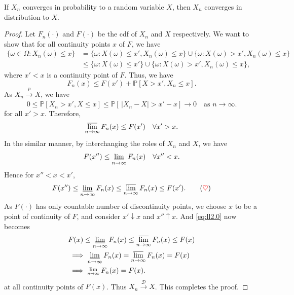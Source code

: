\begin{theorem}
    If $X_n$ converges in probability to a random variable $X$, then $X_n$ converges in distribution to $X$.
\end{theorem}
\begin{proof}
    Let $F_n(\cdot)$ and $F(\cdot)$ be the cdf of $X_n$ and $X$ respectively. We want to show that for all continuity points $x$ of $F$, we have
    \begin{align*}
        \{ \omega \in \Omega : X_n(\omega) \leq x \} &= 
        \{ \omega : X(\omega) \leq x', X_n(\omega) \leq x \} \cup 
        \{ \omega : X(\omega) > x', X_n(\omega) \leq x \}\\
        &\leq \{ \omega : X(\omega) \leq x' \} \cup \{ \omega : X(\omega) > x', X_n(\omega) \leq x\},
    \end{align*}
    where $x' < x$ is a continuity point of $F$. Thus, we have
    \begin{equation}
        F_n(x) \leq F(x') + \mathbb{P}[X > x', X_n \leq x].
    \end{equation}
    As $X_n \xrightarrow[]{p} X$, we have 
    \begin{equation}
        0 \leq \mathbb{P}[X_n > x', X \leq x] \leq \mathbb{P} \left[\, |X_n - X| > x' - x \right]
        \to 0 \quad \text{as } n \to \infty.
    \end{equation}
    for all $x' > x$. Therefore, 
    \begin{equation}
        \operatorname*{\overline{lim}}_{n \to \infty} F_n(x) \leq F(x') \quad \forall x' > x.
    \end{equation}
    In the similar manner, by interchanging the roles of $X_n$ and $X$, we have
    \begin{equation}
        F(x'') \leq \operatorname*{\underline{lim}}_{n \to \infty} F_n(x) \quad \forall x'' < x.
    \end{equation}
    Hence for $x'' < x < x'$, 
    \begin{equation}
        F(x'') \leq \lowlim_{n \to \infty} F_n(x) \leq \uplim_{n \to \infty} F_n(x) \leq F(x'). \label{eq:ll2.0} \tag{{\color{red} $\heartsuit$}}
    \end{equation}
    As $F(\cdot)$ has only countable number of discontinuity points, we choose 
    $x$ to be a point of continuity of $F$, and consider $x' \downarrow x$ and $x'' \uparrow x$. And \eqref{eq:ll2.0} now becomes
    \begin{align*}
        &F(x) \leq \lowlim_{n \to \infty} F_n(x) \leq \uplim_{n \to \infty} F_n(x) \leq F(x) \\
        &\implies \lowlim_{n \to \infty} F_n(x) = \uplim_{n \to \infty} F_n(x) = F(x)\\
        &\implies \Lim{n \to \infty} F_n(x) = F(x).
    \end{align*}
    at all continuity points of $F(x)$. Thus $X_n \xrightarrow[]{\mathcal{D}} X$. This completes the proof.
\end{proof}

